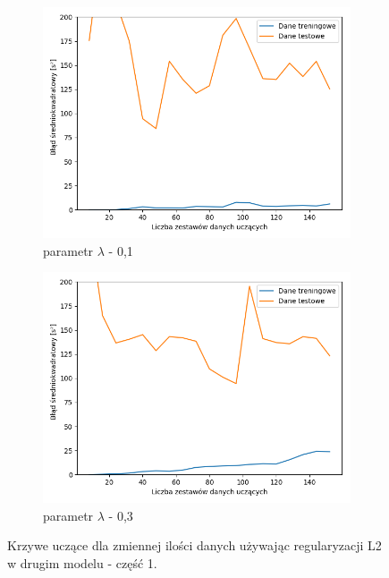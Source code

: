 \documentclass[12pt]{aghdpl}
\begin{document}
		 \begin{figure}[h]
		 	\centering
		 	\begin{subfigure}{.8\linewidth}
		 		\includegraphics[width =\linewidth]{wykresy/6_regularyzacja/l2/regularyzacja_0_1_learning_curves.png}
		 		\caption{parametr $\lambda$ - 0,1}
		 	\end{subfigure}
		 	\begin{subfigure}{.8\linewidth}
		 		\includegraphics[width =\linewidth]{wykresy/6_regularyzacja/l2/regularyzacja_0_3_learning_curves.png}
		 		\caption{parametr $\lambda$ - 0,3}
		 	\end{subfigure}

			\caption{Krzywe uczące dla zmiennej ilości danych używając regularyzacji L2 w drugim modelu - część 1.}
			\label{fig: drugi_model_przy_regularyzacji_l2_learning_curves_1}
		\end{figure}		 	
		 	
\end{document}
